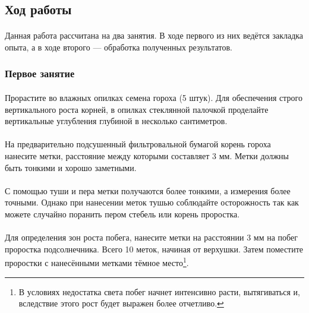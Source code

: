 \subsection*{Ход работы}

\paragraph*{}Данная работа рассчитана на два занятия. В ходе первого из них ведётся закладка опыта, а в ходе второго — обработка полученных результатов.

	\subsubsection*{Первое занятие}
	
	\paragraph*{}Прорастите во влажных опилках семена гороха (5 штук). Для обеспечения строго вертикального роста корней, в опилках стеклянной палочкой проделайте вертикальные углубления глубиной в несколько сантиметров. 
	
	\paragraph*{}На предварительно подсушенный фильтровальной бумагой корень гороха нанесите метки, расстояние между которыми составляет 3 мм. Метки должны быть тонкими и хорошо заметными. 
	
	\paragraph*{}\warningsign С помощью туши и пера метки получаются более тонкими, а измерения более точными. Однако при нанесении меток тушью соблюдайте осторожность так как можете случайно поранить пером стебель или корень проростка.
	
	\paragraph*{}Для определения зон роста побега, нанесите метки на расстоянии 3 мм на побег проростка подсолнечника. Всего 10 меток, начиная от верхушки. Затем поместите проростки с нанесёнными метками тёмное место\footnote{В условиях недостатка света побег начнет интенсивно расти, вытягиваться и, вследствие этого рост будет выражен более отчетливо.}.
	
